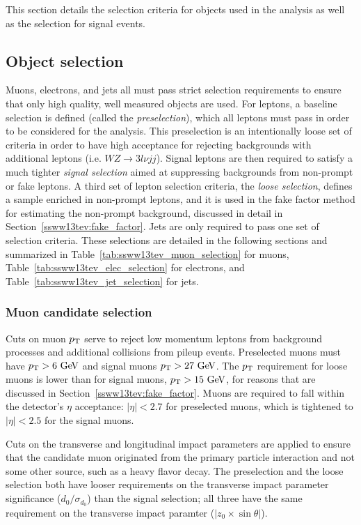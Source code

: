 This section details the selection criteria for objects used in the analysis as well as the selection for signal events.

\subsection{Object selection}\label{ssww13tev:object_selection}
Muons, electrons, and jets all must pass strict selection requirements to ensure that only high quality, well measured objects are used.
For leptons, a baseline selection is defined (called the \emph{preselection}), which all leptons must pass in order to be considered for the analysis.
This preselection is an intentionally loose set of criteria in order to have high acceptance for rejecting backgrounds with additional leptons (i.e. $WZ\rightarrow 3l\nu jj$).
Signal leptons are then required to satisfy a much tighter \emph{signal selection} aimed at suppressing backgrounds from non-prompt or fake leptons.
A third set of lepton selection criteria, the \emph{loose selection}, defines a sample enriched in non-prompt leptons, and it is used in the fake factor method for estimating the non-prompt background, discussed in detail in Section~\ref{ssww13tev:fake_factor}.
Jets are only required to pass one set of selection criteria.
These selections are detailed in the following sections and summarized in Table~\ref{tab:ssww13tev_muon_selection} for muons, Table~\ref{tab:ssww13tev_elec_selection} for electrons, and Table~\ref{tab:ssww13tev_jet_selection} for jets.

\subsubsection{Muon candidate selection}
Cuts on muon $p_{\mathrm{T}}$ serve to reject low momentum leptons from background processes and additional collisions from pileup events.
Preselected muons must have $\pt > 6\gev$ and signal muons $\pt > 27\gev$.
The $p_{\mathrm{T}}$ requirement for loose muons is lower than for signal muons, $\pt > 15\gev$, for reasons that are discussed in Section~\ref{ssww13tev:fake_factor}. 
Muons are required to fall within the detector's $\eta$ acceptance: $|\eta| < 2.7$ for preselected muons, which is tightened to $|\eta| < 2.5$ for the signal muons.

Cuts on the transverse and longitudinal impact parameters are applied to ensure that the candidate muon originated from the primary particle interaction and not some other source, such as a heavy flavor decay.
The preselection and the loose selection both have looser requirements on the transverse impact parameter significance ($d_0/\sigma_{d_{0}}$) than the signal selection; all three have the same requirement on the transverse impact paramter ($|z_0\times\sin\theta|$).

